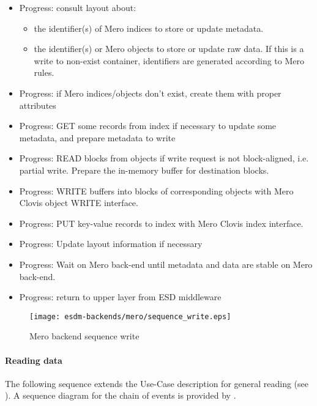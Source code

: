 \begin{itemize}
	\item Progress: consult layout about:
	\begin{itemize}
		\item the identifier(s) of Mero indices to store or update metadata.
		\item the identifier(s) or Mero objects to store or update raw data. %
		      If this is a write to non-exist container, identifiers are generated
		      according to Mero rules.
	\end{itemize}
	\item Progress: if Mero indices/objects don't exist, create them with proper attributes
	\item Progress: GET some records from index if necessary to update some metadata, %
			and prepare metadata to write
	\item Progress: READ blocks from objects if write request is not block-aligned, %
			i.e. partial write. Prepare the in-memory buffer for destination blocks.
	\item Progress: WRITE buffers into blocks of corresponding objects with Mero %
			Clovis object WRITE interface.
	\item Progress: PUT key-value records to index with Mero Clovis index interface.
	\item Progress: Update layout information if necessary
	\item Progress: Wait on Mero back-end until metadata and data are stable on Mero back-end.
	\item Progress: return to upper layer from ESD middleware
\end{itemize}

\begin{figure}
	\centering
	\texttt{[image: esdm-backends/mero/sequence\_write.eps]}
	\caption{Mero backend sequence write}
	\label{fig:mero backend sequence write}
\end{figure}


\paragraph{Reading data}

The following sequence extends the Use-Case description for general reading
(see ).
A sequence diagram for the chain of events is provided by .


